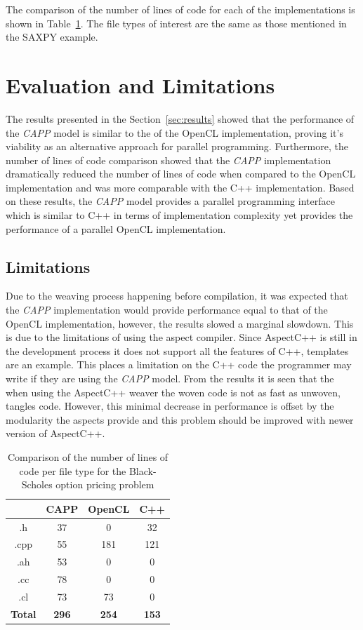 \documentclass{sig-alternate-05-2015}
\begin{document}
The comparison of the number of lines of code for each of the implementations is
shown in Table~\ref{tab:blackscholes}. The file types of interest are the same as 
those mentioned in the SAXPY example. 

\section{Evaluation and Limitations}\label{sec:evaluation}

The results presented in the Section~\ref{sec:results} showed that the
performance of the \textit{CAPP} model is similar to the of the OpenCL
implementation, proving it's viability as an alternative approach for parallel
programming. Furthermore, the number of lines of code comparison showed that the
\textit{CAPP} implementation dramatically reduced the number of lines of code
when compared to the OpenCL implementation and was more comparable with the C++
implementation. Based on these results, the \textit{CAPP} model provides a
parallel programming interface which is similar to C++ in terms of
implementation complexity yet provides the performance of a parallel OpenCL
implementation.

\subsection{Limitations}

Due to the weaving process happening before compilation, it was expected that
the \textit{CAPP} implementation would provide performance equal to that of the
OpenCL implementation, however, the results slowed a marginal slowdown. This is
due to the limitations of using the aspect compiler. Since AspectC++ is still in
the development process it does not support all the features of C++, templates
are an example. This places a limitation on the C++ code the programmer may
write if they are using the \textit{CAPP} model. From the results it is seen that
the when using the AspectC++ weaver the woven code is not as fast as unwoven,
tangles code. However, this minimal decrease in performance is offset by the
modularity the aspects provide and this problem should be improved with newer
version of AspectC++.

\begin{table}[!b]
\centering
\caption{Comparison of the number of lines of code per file type for the
Black-Scholes option pricing problem }
\label{tab:blackscholes}
\begin{tabular}{|c|c|c|c|} 
	\hline
				& CAPP			& OpenCL		& C++		\\ \hline
.h				& 37			& 0				& 32		\\ \hline
.cpp			& 55			& 181			& 121		\\ \hline
.ah				& 53			& 0				& 0			\\ \hline
.cc				& 78			& 0				& 0			\\ \hline
.cl				& 73			& 73			& 0			\\ \hline
\textbf{Total}	& \textbf{296}	& \textbf{254}	& \textbf{153}		\\ \hline		
\hline
\end{tabular}
\end{table}
\end{document}
